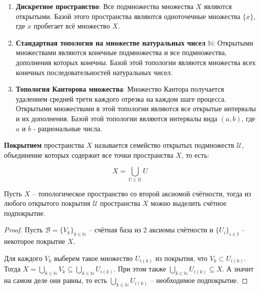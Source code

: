 \begin{example}
	
\begin{enumerate}
    \item \textbf{Дискретное пространство}: Все подмножества множества \(X\) являются открытыми. Базой этого пространства являются одноточечные множества \( \{x\} \), где \(x\) пробегает всё множество \(X\).
    
    \item \textbf{Стандартная топология на множестве натуральных чисел \( \mathbb{N} \)}: Открытыми множествами являются конечные подмножества и все подмножества, дополнения которых конечны. Базой этой топологии являются множества всех конечных последовательностей натуральных чисел.
    
    \item \textbf{Топология Канторова множества}: Множество Кантора получается удалением средней трети каждого отрезка на каждом шаге процесса. Открытыми множествами в этой топологии являются все открытые интервалы и их дополнения. Базой этой топологии являются интервалы вида \((a, b)\), где \(a\) и \(b\) - рациональные числа.
\end{enumerate}

\end{example}

\begin{definition}[Покрытие]
	\textbf{Покрытием} пространства \( X \) называется семейство открытых подмножеств \( \mathcal{U} \), объединение которых содержит все точки пространства \( X \), то есть:

\[
X = \bigcup_{U \in \mathcal{U}} U
\]
\end{definition}

\begin{theorem}[Линделёфа]
	Пусть \( X \) -- топологическое пространство со второй аксиомой счётности, тогда из любого открытого покрытия \( \mathcal{U} \) пространства \( X \) можно выделить счётное подпокрытие.
\end{theorem}
\begin{proof}
	Пусть \(\mathcal{B} = \{V_k\}_{k \in \mathbb{N}}\) -- счётная база из 2 аксиомы счётности и \(\{U_i\}_{i \in \mathbb{I}}\) -- некоторое покрытие \(X\).

	Для каждого \(V_k\) выберем такое множество \(U_{i(k)}\) из покрытия, что \(V_k \subset U_{i(k)}\). Тогда \(X = \bigcup_{k \in \mathbb{N}} V_k \subseteq \bigcup_{k \in \mathbb{N}} U_{i(k)}\). При этом также \(\bigcup_{k \in \mathbb{N}} U_{i(k)} \subseteq X\). А значит на самом деле они равны, то есть \(\bigcup_{k \in \mathbb{N}} U_{i(k)}\) -- необходимое подпокрытие.
\end{proof}

